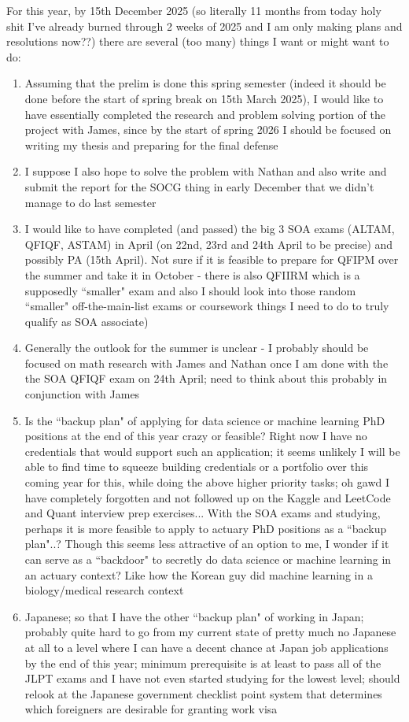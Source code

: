 \documentclass[hidelinks, 12pt]{article}
\theoremstyle{mydefstyle}
\theoremstyle{mythmstyle}
\begin{document}
For this year, by 15th December 2025 (so literally 11 months from today holy shit I've already burned through 2 weeks of 2025 and I am only making plans and resolutions now??) there are several (too many) things I want or might want to do:
\begin{enumerate}
\item Assuming that the prelim is done this spring semester (indeed it should be done before the start of spring break on 15th March 2025), I would like to have essentially completed the research and problem solving portion of the project with James, since by the start of spring 2026 I should be focused on writing my thesis and preparing for the final defense
\item I suppose I also hope to solve the problem with Nathan and also write and submit the report for the SOCG thing in early December that we didn't manage to do last semester
\item I would like to have completed (and passed) the big 3 SOA exams (ALTAM, QFIQF, ASTAM) in April (on 22nd, 23rd and 24th April to be precise) and possibly PA (15th April). Not sure if it is feasible to prepare for QFIPM over the summer and take it in October - there is also QFIIRM which is a supposedly ``smaller" exam and also I should look into those random ``smaller" off-the-main-list exams or coursework things I need to do to truly qualify as SOA associate)
\item Generally the outlook for the summer is unclear - I probably should be focused on math research with James and Nathan once I am done with the the SOA QFIQF exam on 24th April; need to think about this probably in conjunction with James
\item Is the ``backup plan" of applying for data science or machine learning PhD positions at the end of this year crazy or feasible? Right now I have no credentials that would support such an application; it seems unlikely I will be able to find time to squeeze building credentials or a portfolio over this coming year for this, while doing the above higher priority tasks; oh gawd I have completely forgotten and not followed up on the Kaggle and LeetCode and Quant interview prep exercises... With the SOA exams and studying, perhaps it is more feasible to apply to actuary PhD positions as a ``backup plan"..? Though this seems less attractive of an option to me, I wonder if it can serve as a ``backdoor" to secretly do data science or machine learning in an actuary context? Like how the Korean guy did machine learning in a biology/medical research context 
\item Japanese; so that I have the other ``backup plan" of working in Japan; probably quite hard to go from my current state of pretty much no Japanese at all to a level where I can have a decent chance at Japan job applications by the end of this year; minimum prerequisite is at least to pass all of the JLPT exams and I have not even started studying for the lowest level; should relook at the Japanese government checklist point system that determines which foreigners are desirable for granting work visa
\end{enumerate}
\end{document}
